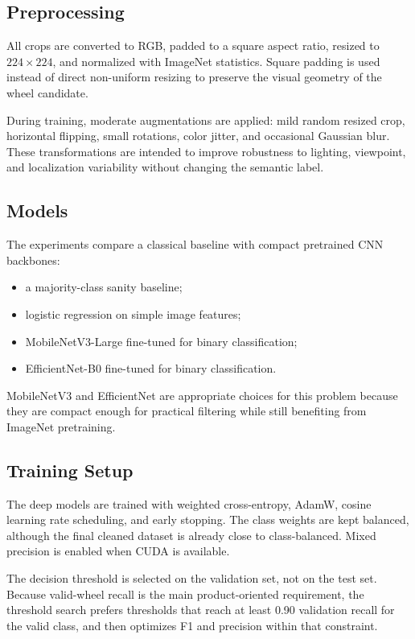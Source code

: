 \documentclass[letterpaper, 10 pt]{IEEEconf}
\begin{document}
\subsection{Preprocessing}

All crops are converted to RGB, padded to a square aspect ratio, resized to
$224 \times 224$, and normalized with ImageNet statistics. Square padding is
used instead of direct non-uniform resizing to preserve the visual geometry of
the wheel candidate.

During training, moderate augmentations are applied: mild random resized crop,
horizontal flipping, small rotations, color jitter, and occasional Gaussian
blur. These transformations are intended to improve robustness to lighting,
viewpoint, and localization variability without changing the semantic label.

\subsection{Models}

The experiments compare a classical baseline with compact pretrained CNN
backbones:
\begin{itemize}
    \item a majority-class sanity baseline;
    \item logistic regression on simple image features;
    \item MobileNetV3-Large fine-tuned for binary classification;
    \item EfficientNet-B0 fine-tuned for binary classification.
\end{itemize}

MobileNetV3 and EfficientNet are appropriate choices for this problem because
they are compact enough for practical filtering while still benefiting from
ImageNet pretraining.

\subsection{Training Setup}

The deep models are trained with weighted cross-entropy, AdamW, cosine learning
rate scheduling, and early stopping. The class weights are kept balanced,
although the final cleaned dataset is already close to class-balanced. Mixed
precision is enabled when CUDA is available.

The decision threshold is selected on the validation set, not on the test set.
Because valid-wheel recall is the main product-oriented requirement, the
threshold search prefers thresholds that reach at least 0.90 validation recall
for the valid class, and then optimizes F1 and precision within that constraint.
\end{document}
